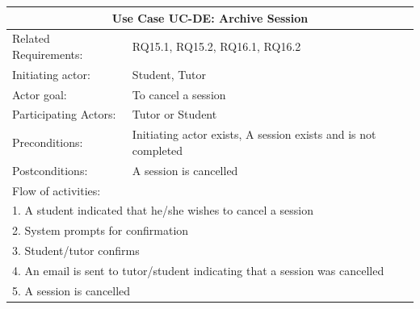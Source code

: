 \documentclass[12pt]{article}
\begin{document}
    \begin{tabular}{| l | p{10cm}| }
			\hline\multicolumn{2}{|c|}{ \textbf{Use Case UC-DE: Archive Session} }\\ \hline
			Related Requirements: &  RQ15.1, RQ15.2, RQ16.1, RQ16.2\\ \hline
			Initiating actor: & Student, Tutor \\ \hline
			Actor goal: & To cancel a session\\ \hline
			Participating Actors: & Tutor or Student\\ \hline
			Preconditions: &Initiating actor exists, A session exists and is not completed\\ \hline
			Postconditions: & A session is cancelled\\ \hline
			\multicolumn{2}{|l|}{Flow of activities:}\\ \hline
			\multicolumn{2}{|p{15cm}|}{1. A student indicated that he/she wishes to cancel a session}\\
			\multicolumn{2}{|p{15cm}|}{2. System prompts for confirmation}\\
			\multicolumn{2}{|l|}{3. Student/tutor confirms}\\
			\multicolumn{2}{|l|}{4. An email is sent to tutor/student indicating that a session was cancelled}\\
			\multicolumn{2}{|l|}{5. A session is cancelled}\\
			 \hline
		\end{tabular}
\end{document}
